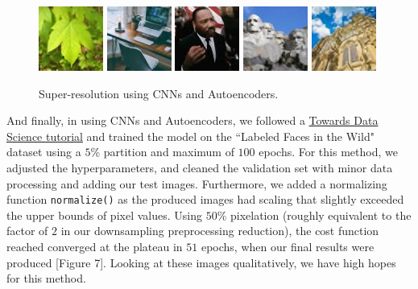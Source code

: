 \documentclass[letterpaper,12pt]{article}
\begin{document}
\begin{figure}[h!]
    \includegraphics[width=.2\textwidth]{cnn-autoencoders/green-maple-leaf.jpg}\hfill
    \includegraphics[width=.2\textwidth]{cnn-autoencoders/home-office.jpg}\hfill
    \includegraphics[width=.2\textwidth]{cnn-autoencoders/martin-luther-king.jpg}\hfill
    \includegraphics[width=.2\textwidth]{cnn-autoencoders/mount-rushmore.jpg}\hfill
    \includegraphics[width=.2\textwidth]{cnn-autoencoders/salisbury-cathedral.jpg}
    \caption{Super-resolution using CNNs and Autoencoders.}
\end{figure}

And finally, in using CNNs and Autoencoders, we followed a \href{https://towardsdatascience.com/image-super-resolution-using-convolution-neural-networks-and-auto-encoders-28c9eceadf90}{Towards Data Science tutorial} \cite{PatelH} and trained the model on the ``Labeled Faces in the Wild" dataset \cite{LFWTech} \cite{LFWTechUpdate} using a $5$\% partition and maximum of $100$ epochs. For this method, we adjusted the hyperparameters, and cleaned the validation set with minor data processing and adding our test images. Furthermore, we added a normalizing function \texttt{normalize()} as the produced images had scaling that slightly exceeded the upper bounds of pixel values. Using $50$\% pixelation (roughly equivalent to the factor of $2$ in our downsampling preprocessing reduction), the cost function reached converged at the plateau in $51$ epochs, when our final results were produced [Figure 7]. Looking at these images qualitatively, we have high hopes for this method.
\end{document}
